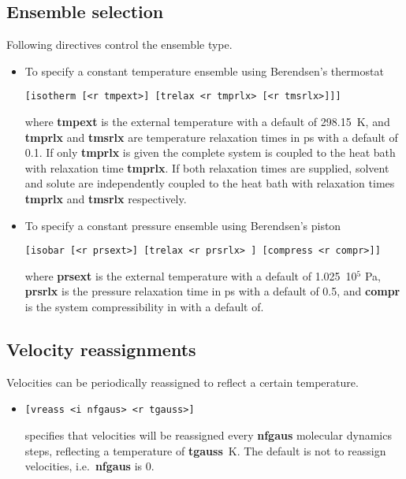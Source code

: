\subsection{Ensemble selection}
Following directives control the ensemble type.
\begin{itemize}
\item
To specify a constant temperature ensemble using Berendsen's thermostat
\begin{verbatim}
[isotherm [<r tmpext>] [trelax <r tmprlx> [<r tmsrlx>]]]
\end{verbatim}
where {\bf tmpext} is the external temperature with a default of 298.15~K,
and {\bf tmprlx} and {\bf tmsrlx} are temperature relaxation times in ps 
with a default of 0.1. If only {\bf tmprlx} is given the complete system
is coupled to the heat bath with relaxation time {\bf tmprlx}. If both
relaxation times are supplied, solvent and solute are independently coupled
to the heat bath with relaxation times {\bf tmprlx} and {\bf tmsrlx}
respectively.
\item
To specify a constant pressure ensemble using Berendsen's piston
\begin{verbatim}
[isobar [<r prsext>] [trelax <r prsrlx> ] [compress <r compr>]]
\end{verbatim}
where {\bf prsext} is the external temperature with a default of 1.025~10$^5$ Pa,
{\bf prsrlx} is the pressure relaxation time in ps with a default of 0.5, and
{\bf compr} is the system compressibility in with a default of.
\end{itemize}
\subsection{Velocity reassignments}
Velocities can be periodically reassigned to reflect a certain temperature.
\begin{itemize}
\item
\begin{verbatim}
[vreass <i nfgaus> <r tgauss>]
\end{verbatim}
specifies that velocities will be reassigned every {\bf nfgaus} molecular
dynamics steps, reflecting a temperature of {\bf tgauss}~K. The default
is not to reassign velocities, i.e.\ {\bf nfgaus} is 0.
\end{itemize}
